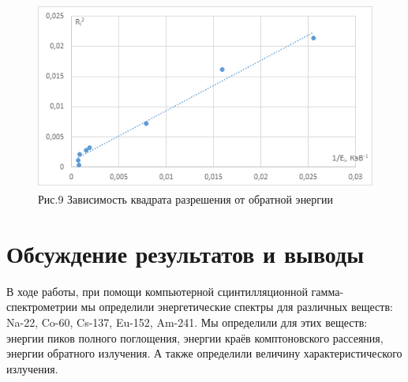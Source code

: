 \documentclass[12pt,a4paper]{article}
\begin{document}
\begin{figure}[H]
	\begin{center}
	\vspace{-1.9ex}
		\includegraphics{5.5.5-9}
		\caption{Рис.9 Зависимость квадрата разрешения от обратной энергии}
	\end{center}
\end{figure}

\section{Обсуждение результатов и выводы}
	
     В ходе работы, при помощи компьютерной сцинтилляционной гамма-спектрометрии мы определили энергетические спектры для различных веществ: Na-22, Co-60, Cs-137, Eu-152, Am-241. Мы определили для этих веществ: энергии пиков полного поглощения, энергии краёв комптоновского рассеяния, энергии обратного излучения. А также определили величину характеристического излучения.
\end{document}
